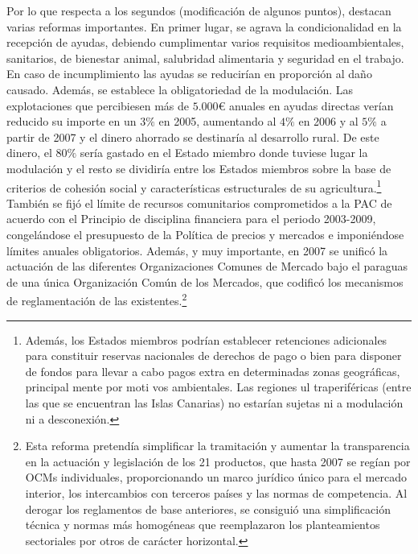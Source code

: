 \documentclass[10pt,a4paper]{article}
\begin{document}
Por lo que respecta a los segundos (modificación de algunos puntos), destacan varias reformas importantes. En primer lugar, se agrava la condicionalidad en la recepción de ayudas, debiendo cumplimentar varios requisitos medioambientales, sanitarios, de bienestar animal, salubridad alimentaria y seguridad en el trabajo. En caso de incumplimiento las ayudas se reducirían en proporción al daño causado. Además, se establece la obligatoriedad de la modulación. Las explotaciones que percibiesen más de $5.000€$ anuales en ayudas directas verían reducido su importe en un $3\%$ en 2005, aumentando al $4\%$ en 2006 y al $5\%$ a partir de 2007 y el dinero ahorrado se destinaría al desarrollo rural. De este dinero, el $80\%$ sería gastado en el Estado miembro donde tuviese lugar la modulación y el resto se dividiría entre los Estados miembros sobre la base de criterios de cohesión social y características estructurales de su agricultura.\footnote{%
    Además, los Estados miembros podrían establecer retenciones adicionales para constituir reservas nacionales de derechos de pago o bien para disponer de fondos para llevar a cabo pagos extra en determinadas zonas geográficas, principal mente por moti vos ambientales. Las regiones ul traperiféricas (entre las que se encuentran las Islas Canarias) no estarían sujetas ni a modulación ni a desconexión.
} También se fijó el límite de recursos comunitarios comprometidos a la PAC de acuerdo con el Principio de disciplina financiera para el periodo 2003-2009, congelándose el presupuesto de la Política de precios y mercados e imponiéndose límites anuales obligatorios. Además, y muy importante, en 2007 se unificó la actuación de las diferentes Organizaciones Comunes de Mercado bajo el paraguas de una única Organización Común de los Mercados, que codificó los mecanismos de reglamentación de las existentes.\footnote{%
    Esta reforma pretendía simplificar la tramitación y aumentar la transparencia en la actuación y legislación de los 21 productos, que hasta 2007 se regían por OCMs individuales, proporcionando un marco jurídico único para el mercado interior, los intercambios con terceros países y las normas de competencia. Al derogar los reglamentos de base anteriores, se consiguió una simplificación técnica y normas más homogéneas que reemplazaron los planteamientos sectoriales por otros de carácter horizontal.
}
\end{document}
